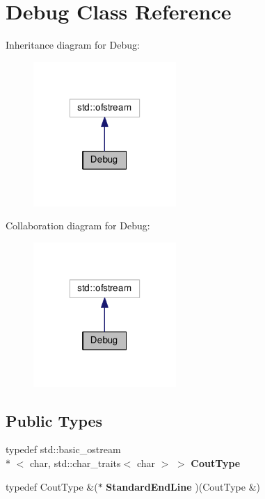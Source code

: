\hypertarget{class_debug}{\section{Debug Class Reference}
\label{class_debug}
}


Inheritance diagram for Debug\-:\nopagebreak
\begin{figure}[H]
\begin{center}
\leavevmode
\includegraphics[width=154pt]{class_debug__inherit__graph}
\end{center}
\end{figure}


Collaboration diagram for Debug\-:\nopagebreak
\begin{figure}[H]
\begin{center}
\leavevmode
\includegraphics[width=154pt]{class_debug__coll__graph}
\end{center}
\end{figure}
\subsection*{Public Types}
\begin{DoxyCompactItemize}
\item 
\hypertarget{class_debug_a47958bd8d27052aae1d3ac2cb75b59a7}{typedef std\-::basic\-\_\-ostream\\*
$<$ char, std\-::char\-\_\-traits$<$ char $>$ $>$ {\bfseries Cout\-Type}}\label{class_debug_a47958bd8d27052aae1d3ac2cb75b59a7}

\item 
\hypertarget{class_debug_a30fab29155ac5ba0dd57c9b96dbe4fe6}{typedef Cout\-Type \&($\ast$ {\bfseries Standard\-End\-Line} )(Cout\-Type \&)}\label{class_debug_a30fab29155ac5ba0dd57c9b96dbe4fe6}

\end{DoxyCompactItemize}
